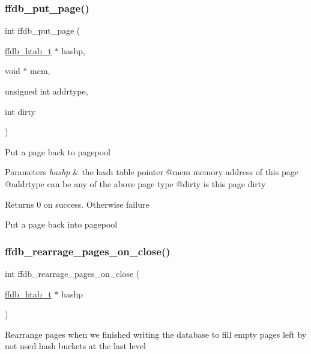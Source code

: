 \subsubsection{\texorpdfstring{ffdb\_put\_page()}{ffdb\_put\_page()}}
{\footnotesize\ttfamily int ffdb\+\_\+put\+\_\+page (\begin{DoxyParamCaption}\item[{\mbox{\hyperlink{adat-devel_2other__libs_2filedb_2filehash_2ffdb__hash_8h_ae592010ed2bedc975d3cc0b7d074b9d1}{ffdb\+\_\+htab\+\_\+t}} $\ast$}]{hashp,  }\item[{void $\ast$}]{mem,  }\item[{unsigned int}]{addrtype,  }\item[{int}]{dirty }\end{DoxyParamCaption})}

Put a page back to pagepool


\begin{DoxyParams}{Parameters}
{\em hashp} & the hash table pointer @mem memory address of this page @addrtype can be any of the above page type @dirty is this page dirty\\
\hline
\end{DoxyParams}
\begin{DoxyReturn}{Returns}
0 on success. Otherwise failure
\end{DoxyReturn}
Put a page back into pagepool \mbox{\label{adat-devel_2other__libs_2filedb_2filehash_2ffdb__hash_8h_a4dd9a21b6c522b97b005a32d7149984c}} 
\subsubsection{\texorpdfstring{ffdb\_rearrage\_pages\_on\_close()}{ffdb\_rearrage\_pages\_on\_close()}}
{\footnotesize\ttfamily int ffdb\+\_\+rearrage\+\_\+pages\+\_\+on\+\_\+close (\begin{DoxyParamCaption}\item[{\mbox{\hyperlink{adat-devel_2other__libs_2filedb_2filehash_2ffdb__hash_8h_ae592010ed2bedc975d3cc0b7d074b9d1}{ffdb\+\_\+htab\+\_\+t}} $\ast$}]{hashp }\end{DoxyParamCaption})}

Rearrange pages when we finished writing the database to fill empty pages left by not used hash buckets at the last level


